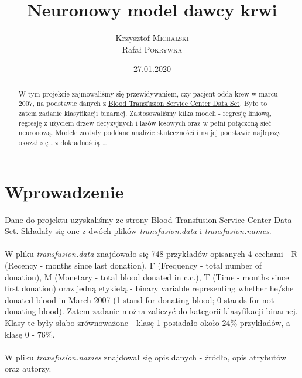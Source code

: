 \documentclass[11pt, a4paper, notitlepage]{report}
\author{Krzysztof \textsc{Michalski} \\ Rafał \textsc{Pokrywka} }
\title{\textbf{Neuronowy model dawcy krwi}}
\date{27.01.2020}
\begin{document}
\clearpage\maketitle
\thispagestyle{empty}
\begin{abstract}
	W tym projekcie zajmowaliśmy się przewidywaniem, czy pacjent odda krew w marcu 2007, na podstawie danych z \href{https://archive.ics.uci.edu/ml/datasets/Blood+Transfusion+Service+Center/}{Blood Transfusion Service Center Data Set}. 
	Było to zatem zadanie klasyfikacji binarnej. Zastosowaliśmy kilka modeli - regresję liniową, regresję z użyciem drzew decyzyjnych i lasów losowych oraz w pełni połączoną sieć neuronową. Modele zostały poddane analizie skuteczności i na jej podstawie
	najlepszy okazał się \ldots z dokładnością \ldots 
\end{abstract}

\clearpage \tableofcontents
\thispagestyle{empty}

\setcounter{page}{1}

\chapter{Wprowadzenie}
	Dane do projektu uzyskaliśmy ze strony \href{https://archive.ics.uci.edu/ml/datasets/Blood+Transfusion+Service+Center/}{Blood Transfusion Service Center Data Set}. Składały się one z dwóch plików {\it transfusion.data} i {\it transfusion.names}.\\ \\
	W pliku  {\it transfusion.data} znajdowało się 748 przykładów opisanych 4 cechami - R (Recency - months since last donation), F (Frequency - total number of donation), M (Monetary - total blood donated in c.c.), T (Time - months since first donation) oraz
	jedną etykietą - binary variable representing whether he/she donated blood in March 2007 (1 stand for donating blood; 0 stands for not donating blood). Zatem zadanie można zaliczyć do kategorii klasyfikacji binarnej. Klasy te były słabo zrównoważone - klasę 1
	posiadało około 24\% przykładów, a klasę 0 - 76\%.\\ \\
	W pliku {\it transfusion.names} znajdował się opis danych - źródło, opis atrybutów oraz autorzy.
\end{document}
